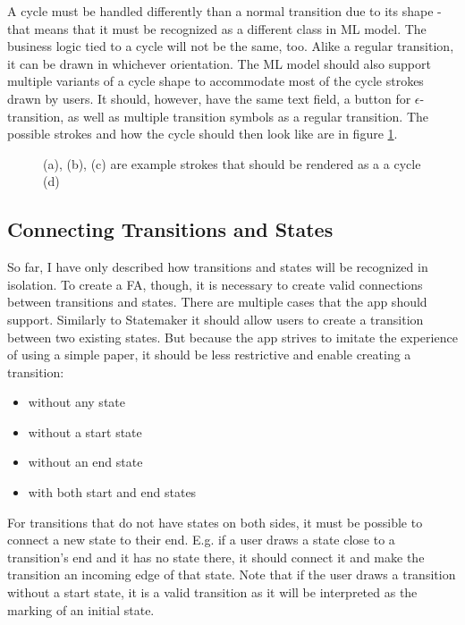 A cycle must be handled differently than a normal transition due to its shape - that means that it must be recognized as a different class in ML model. The business logic tied to a cycle will not be the same, too. Alike a regular transition, it can be drawn in whichever orientation. The ML model should also support multiple variants of a cycle shape to accommodate most of the cycle strokes drawn by users. It should, however, have the same text field, a button for $\epsilon$-transition, as well as multiple transition symbols as a regular transition. The possible strokes and how the cycle should then look like are in figure \ref{cycle}.

\begin{figure}
    \centering
    \caption{(a), (b), (c) are example strokes that should be rendered as a a cycle (d)}\label{cycle}
\end{figure}

\subsection{Connecting Transitions and States}

So far, I have only described how transitions and states will be recognized in isolation. To create a FA, though, it is necessary to create valid connections between transitions and states. There are multiple cases that the app should support. Similarly to Statemaker \cite{state-maker} it should allow users to create a transition between two existing states. But because the app strives to imitate the experience of using a simple paper, it should be less restrictive and enable creating a transition:
\begin{itemize}
    \item without any state
    \item without a start state
    \item without an end state
    \item with both start and end states
\end{itemize}
For transitions that do not have states on both sides, it must be possible to connect a new state to their end. E.g. if a user draws a state close to a transition's end and it has no state there, it should connect it and make the transition an incoming edge of that state. Note that if the user draws a transition without a start state, it is a valid transition as it will be interpreted as the marking of an initial state.

